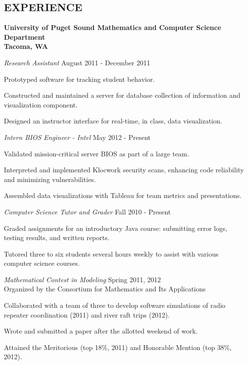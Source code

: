 \documentclass[line,margin,11pt]{res}
\newenvironment{itemize*}%
  {\begin{itemize}%
    \setlength{\parsep}{0pt}
    \setlength{\itemsep}{0pt}%
    \setlength{\parskip}{0pt}}%
  {\end{itemize}}
\begin{document}
\begin{resume}
\vspace*{.2cm} 

\section{EXPERIENCE} 
\textbf{University of Puget Sound
Mathematics and Computer Science Department\\
Tacoma, WA}

{\sl Research Assistant} \hfill August 2011 - December 2011
\begin{itemize*}
    \item Prototyped software for tracking student behavior.
    \item Constructed and maintained a server for database collection of 
      information and visualization component.
    \item Designed an instructor interface for real-time, in class, data 
      visualization.
\end{itemize*}            

{\sl Intern BIOS Engineer - Intel} \hfill May 2012 - Present
\begin{itemize*}
    \item Validated mission-critical server BIOS as part of a large team.
    \item Interpreted and implemented Klocwork security scans, enhancing 
        code reliability and minimizing vulnerabilities.
    \item Assembled data visualizations with Tableau for team metrics and 
        presentations.
\end{itemize*}            

{\sl Computer Science Tutor and Grader} \hfill Fall 2010 - Present
\begin{itemize*}  
    \item Graded assignments for an introductory Java course: submitting 
      error logs, testing results, and written reports.
    \item Tutored three to six students several hours weekly to assist with 
      various computer science courses.
\end{itemize*}

{\sl Mathematical Contest in Modeling} \hfill Spring 2011, 2012\\
Organized by the Consortium for Mathematics and Its Applications
\begin{itemize*}
\item Collaborated with a team of three to develop software 
  simulations of radio repeater coordination (2011) and river raft trips 
  (2012).
\item Wrote and submitted a paper after the allotted weekend of work.
\item Attained the Meritorious (top 18\%, 2011) and Honorable 
    Mention (top 38\%, 2012).
\end{itemize*}

\end{resume}
\end{document}
